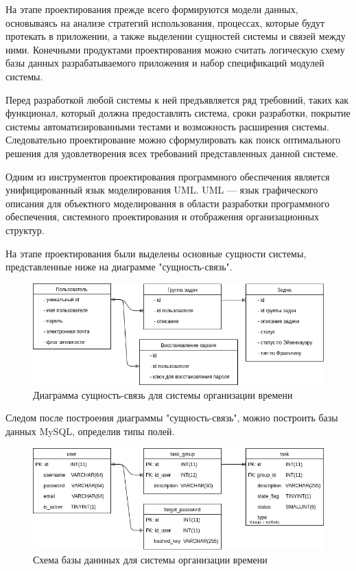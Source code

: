 На этапе проектирования прежде всего формируются модели данных, основываясь на анализе стратегий использования, процессах, которые будут протекать в приложении, а также выделении сущностей системы и связей между ними. Конечными продуктами проектирования можно считать логическую схему базы данных разрабатываемого приложения и набор спецификаций модулей системы.

Перед разработкой любой системы к ней предъявляется ряд требовний, таких как функционал, который должна предоставлять система, сроки разработки, покрытие системы автоматизированными тестами и возможность расширения системы. Следовательно проектирование можно сформулировать как поиск оптимального решения для удовлетворения всех требований представленных данной системе.

Одним из инструментов проектирования программного обеспечения является унифицированный язык моделирования UML. UML — язык графического описания для объектного моделирования в области разработки программного обеспечения, системного проектирования и отображения организационных структур.

На этапе проектирования были выделены основные сущности системы, представленные ниже на диаграмме "сущность-связь".

\begin{figure}[ht]
\centering
  \includegraphics[scale=0.5]{images/entity-relation.png}  
  \caption{ Диаграмма сущность-связь для системы организации времени }
  \label{fig:domain:todist}
\end{figure}

Следом после построения диаграммы "сущность-связь", можно построить базы данных MySQL, определив типы полей.

\begin{figure}[ht]
\centering
  \includegraphics[scale=0.5]{images/mysql_schema.png}  
  \caption{ Схема базы даннных для системы организации времени }
  \label{fig:domain:todist}
\end{figure}



